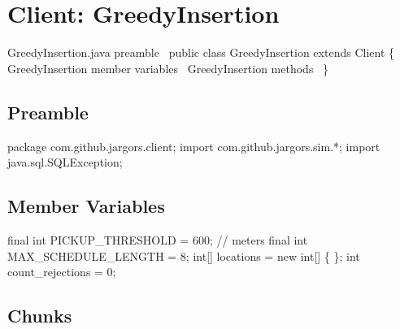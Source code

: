 \nwenddocs{}\chapter{Client: GreedyInsertion}

\nwenddocs{}\endmoddef\nwstartdeflinemarkup\nwenddeflinemarkup
\LA{}GreedyInsertion.java preamble~{\nwtagstyle{}}\RA{}
public class GreedyInsertion extends Client \{
  \LA{}\code{}GreedyInsertion\edoc{} member variables~{\nwtagstyle{}}\RA{}
  \LA{}\code{}GreedyInsertion\edoc{} methods~{\nwtagstyle{}}\RA{}
\}
\nwendcode{}\nwdocspar

\section{Preamble}
\nwenddocs{}\endmoddef\nwstartdeflinemarkup{}\nwenddeflinemarkup
package com.github.jargors.client;
import com.github.jargors.sim.*;
import java.sql.SQLException;
\nwendcode{}\nwdocspar

\section{Member Variables}
\nwenddocs{}\endmoddef\nwstartdeflinemarkup{}\nwenddeflinemarkup
final int PICKUP_THRESHOLD = 600;  // meters
final int MAX_SCHEDULE_LENGTH = 8;
int[] locations = new int[] \{ \};
int count_rejections = 0;
\nwendcode{}\nwdocspar

\section{Chunks}

